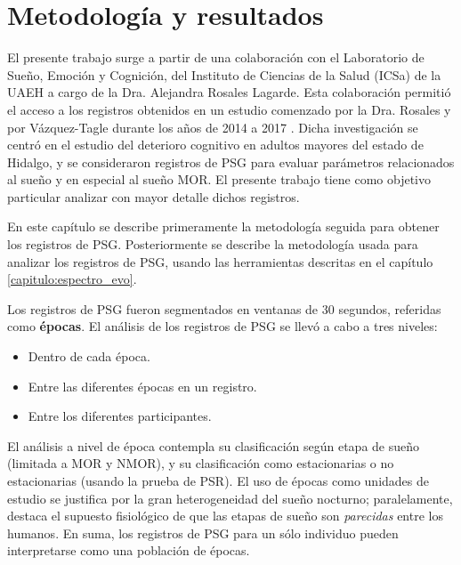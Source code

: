 \documentclass[12pt,letterpaper]{book}
\begin{document}

\chapter{Metodología y resultados}
\label{ch:metodologia}

El presente trabajo surge a partir de una colaboración con el Laboratorio de Sueño, Emoción y Cognición, del Instituto de Ciencias de la Salud (ICSa) de la UAEH a cargo de la Dra. Alejandra Rosales Lagarde.
%
Esta colaboración permitió el acceso a los registros obtenidos en un estudio comenzado por la Dra. Rosales y por Vázquez-Tagle durante los años de 2014 a 2017 \cite{VazquezTagle16}. 
%
Dicha investigación se centró en el estudio del deterioro cognitivo en adultos mayores del estado de Hidalgo, y se consideraron registros de PSG para evaluar parámetros relacionados al sueño y en especial al sueño MOR.
%
El presente trabajo tiene como objetivo particular analizar con mayor detalle dichos registros.

En este capítulo se describe primeramente la metodología seguida para obtener los registros de PSG.
%
Posteriormente se describe la metodología usada para analizar los registros de PSG, usando las herramientas descritas en el capítulo \ref{capitulo:espectro_evo}.

Los registros de PSG fueron segmentados en ventanas de 30 segundos, referidas como \textbf{épocas}.
%
El análisis de los registros de PSG se llevó a cabo a tres niveles:
\begin{itemize}
\item Dentro de cada época.
\item Entre las diferentes épocas en un registro.
\item Entre los diferentes participantes.
\end{itemize}

El análisis a nivel de época contempla su clasificación según etapa de sueño (limitada a MOR y NMOR), y su clasificación como estacionarias o no estacionarias (usando la prueba de PSR).
%
El uso de épocas como unidades de estudio se justifica por la gran heterogeneidad del sueño nocturno; paralelamente, destaca el supuesto fisiológico de que las etapas de sueño son \textit{parecidas} entre los humanos.
%
En suma, los registros de PSG para un sólo individuo pueden interpretarse como una población de épocas.
\end{document}
